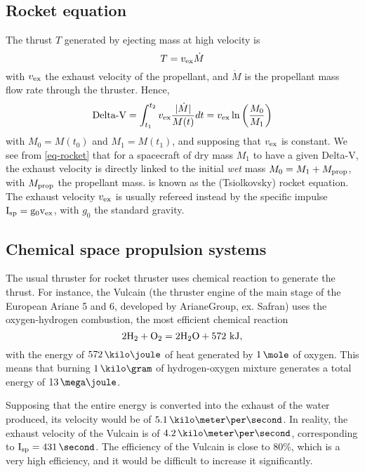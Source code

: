 \subsection*{Rocket equation}
The thrust $T$ generated by ejecting mass at high velocity is
\begin{equation} \label{eq-thurst}
  T = v_{\rm ex} \dot{M}
\end{equation}
with $v_{\rm ex}$ the exhaust velocity of the propellant, and $\dot{M}$ is the propellant mass flow rate through the thruster.
Hence,
\begin{equation} \label{eq-rocket}
  \text{Delta-V} = \int_{t_1}^{t_2} v_{\rm ex} \frac{ \lvert\dot{M}\rvert}{M(t)} dt = v_{\rm ex} \ln \left( \frac{M_0}{M_1} \right)
\end{equation}
with $M_0 = M(t_0)$ and $M_1=M(t_1)$, and supposing that $v_{\rm ex}$ is constant.
We see from \cref{eq-rocket} that for a spacecraft of dry mass $M_1$ to have a given Delta-V, the exhaust velocity is directly linked to the initial \emph{wet} mass $M_0 = M_1 + M_{\rm prop}$, with $M_{\rm prop}$ the propellant mass.
 is known as the (Tsiolkovsky) rocket equation.
The exhaust velocity $v_{\rm ex}$ is usually refereed instead by the specific impulse $\rm I_{\rm sp} = g_0 v_{\rm ex}$, with $g_0$ the standard gravity.

\subsection*{Chemical space propulsion systems}
The usual thruster for rocket thruster uses chemical reaction to generate the thrust.
For instance, the Vulcain (the thruster engine of the main stage of the European Ariane 5 and 6, developed by ArianeGroup, ex. Safran) uses the oxygen-hydrogen combustion, the most efficient chemical reaction \citep{nasa-H2O2}
\begin{equation*}
  2 {\rm H_2} + { \rm O_2} = 2 {\rm H_2 O} + 572 \text{~kJ},
\end{equation*}
with the energy of $572\,\kilo\joule$ of heat generated by $1\,\mole$ of oxygen.
This means that burning $1\,\kilo\gram$ of hydrogen-oxygen mixture generates a total energy of $13\,\mega\joule$. 

Supposing that the entire energy is converted into the exhaust of the water produced, its velocity would be of $5.1 \,\kms$.
In reality, the exhaust velocity of the Vulcain is of $4.2 \,\kms$, corresponding to $\Isp=431 \,\second$.
The efficiency of the Vulcain is close to 80\%, which is a very high efficiency, and it would be difficult to increase it significantly. 

